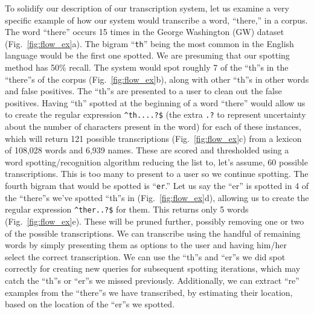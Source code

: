 \documentclass[ms]{byuprop}
\begin{document}
To solidify our description of our transcription system, let us examine a very specific example of how our system would transcribe a word, ``there,'' in a corpus. The word ``there'' occurs 15 times in the George Washington (GW) dataset\cite{GW} (Fig.~\ref{fig:flow_ex}a). The bigram ``\texttt{th}'' being the most common in the English language would be the first one spotted. We are presuming that our spotting method has 50\% recall. The system would spot roughly 7 of the ``th''s in the ``there''s of the corpus (Fig.~\ref{fig:flow_ex}b), along with other ``th''s in other words and false positives. The ``th''s are presented to a user to clean out the false positives. Having ``th'' spotted at the beginning of a word ``there'' would allow us to create the regular expression \texttt{{\textasciicircum}th....?\$} (the extra \texttt{.?} to represent uncertainty about the number of characters present in the word) for each of these instances, which will return 121 possible transcriptions (Fig.~\ref{fig:flow_ex}c) from a lexicon of 108,028 words and 6,939 names. These are scored and thresholded using a word spotting/recognition algorithm reducing the list to, let's assume, 60 possible transcriptions. This is too many to present to a user so we continue spotting. The fourth bigram that would be spotted is ``\texttt{er}.'' Let us say the ``er'' is spotted in 4 of the ``there''s we've spotted ``th''s in (Fig.~\ref{fig:flow_ex}d), allowing us to create the regular expression \texttt{{\textasciicircum}ther..?\$} for them. This returns only 5 words (Fig.~\ref{fig:flow_ex}e). These will be pruned further, possibly removing one or two of the possible transcriptions. We can transcribe using the handful of remaining words by simply presenting them as options to the user and having him/her select the correct transcription. We can use the ``th''s and ``er''s we did spot correctly for creating new queries for subsequent spotting iterations, which may catch the ``th''s or ``er''s we missed previously. Additionally, we can extract  ``re'' examples from the ``there''s we have transcribed, by estimating their location, based on the location of the ``er''s we spotted.
\end{document}

